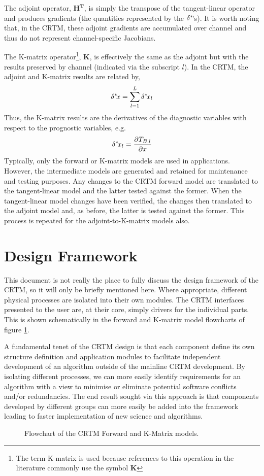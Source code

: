 The adjoint operator, $\mathbf{H^T}$, is simply the transpose of the tangent-linear operator and produces gradients (the quantities represented by the $\delta^{*}\!$'s). It is worth noting that, in the CRTM, these adjoint gradients are accumulated over channel and thus do not represent channel-specific Jacobians.

The K-matrix operator\footnote{The term K-matrix is used because references to this operation in the literature commonly use the symbol $\mathbf{K}$}, $\mathbf{K}$, is effectively the same as the adjoint but with the results preserved by channel (indicated via the subscript $l$). In the CRTM, the adjoint and K-matrix results are related by,
\begin{equation}
  \delta^{*}\!{x} = \sum_{l=1}^{L}\delta^{*}\!{x}_l
\end{equation}
Thus, the K-matrix results are the derivatives of the diagnostic variables with respect to the prognostic variables, e.g.
\begin{equation}
  \delta^{*}\!{x_{l}} = \frac{\partial{T_{B,l}}}{\partial{x}}
\end{equation}
Typically, only the forward or K-matrix models are used in applications. However, the intermediate models are generated and retained for maintenance and testing purposes. Any changes to the CRTM forward model are translated to the tangent-linear model and the latter tested against the former. When the tangent-linear model changes have been verified, the changes then translated to the adjoint model and, as before, the latter is tested against the former. This process is repeated for the adjoint-to-K-matrix models also.


\section{Design Framework}
This document is not really the place to fully discuss the design framework of the CRTM, so it will only be briefly mentioned here. Where appropriate, different physical processes are isolated into their own modules. The CRTM interfaces presented to the user are, at their core, simply drivers for the individual parts. This is shown schematically in the forward and K-matrix model flowcharts of figure \ref{fig:fwd_k_flowchart}.

A fundamental tenet of the CRTM design is that each component define its own structure definition and application modules to facilitate independent development of an algorithm outside of the mainline CRTM development. By isolating different processes, we can more easily identify requirements for an algorithm with a view to minimise or eliminate potential software conflicts and/or redundancies. The end result sought via this approach is that components developed by different groups can more easily be added into the framework leading to faster implementation of new science and algorithms.

\begin{figure}[htp]
  \centering
  
  \caption{Flowchart of the CRTM Forward and K-Matrix models.}
  \label{fig:fwd_k_flowchart}
\end{figure}

